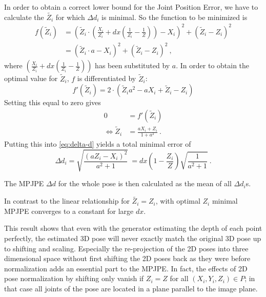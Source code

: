 In order to obtain a correct lower bound for the Joint Position Error, we have to calculate the $\widetilde{Z_i}$ for which $\Delta d_i$ is minimal.
So the function to be minimized is
\begin{align}
	\label{eq:minimum-distance}
	f(\widetilde{Z}_i) &= \left ( \widetilde{Z}_i \cdot \left( \frac{X_i}{Z_i} + dx \left( \frac{1}{Z_i} - \frac{1}{Z} \right) \right ) - X_i \right)^2 + ( \widetilde{Z}_i - Z_i ) ^2 \\
	&= \left ( \widetilde{Z}_i \cdot a - X_i \right)^2 + ( \widetilde{Z}_i - Z_i )^2 \ ,
\end{align}
where $\left( \frac{X_i}{Z_i} + dx \left( \frac{1}{Z_i} - \frac{1}{Z} \right) \right )$ has been substituted by $a$.
In order to obtain the optimal value for $\widetilde{Z}_i$, $f$ is differentiated by $\widetilde{Z}_i$:
\begin{equation}
	f'(\widetilde{Z}_i) = 2 \cdot (\widetilde{Z}_i a^2 - a X_i + \widetilde{Z}_i - Z_i)
\end{equation}
Setting this equal to zero gives
\begin{align}
	0 &= f'(\widetilde{Z}_i) \\
	\Leftrightarrow \widetilde{Z}_i & = \frac{a X_i + Z_i}{1 + a^2} \ .
\end{align}
Putting this into \eqref{eq:delta-d} yields a total minimal error of 
\begin{equation}
	\label{eq:minimum-delta-d}
	\Delta d_i = \sqrt{\frac{(a Z_i - X_i)^2}{a^2 + 1}}\
	= dx (1 -  \frac{Z_i}{Z}) \sqrt{\frac{1}{a^2 + 1}} \ .
\end{equation}

The MPJPE $\Delta d$ for the whole pose is then calculated as the mean of all $\Delta d_i$s.

In contrast to the linear relationship for $\widetilde{Z_i} = Z_i$, with optimal $Z_i$ minimal MPJPE converges to a constant for large $dx$.

This result shows that even with the generator estimating the depth of each point perfectly, the estimated 3D pose will never exactly match the original 3D pose up to shifting and scaling.
Especially the re-projection of the 2D poses into three dimensional space without first shifting the 2D poses back as they were before normalization adds an essential part to the MPJPE.
In fact, the effects of 2D pose normalization by shifting only vanish if $Z_i = Z$ for all $(X_i, Y_i, Z_i) \in P$; in that case all joints of the pose are located in a plane parallel to the image plane.


